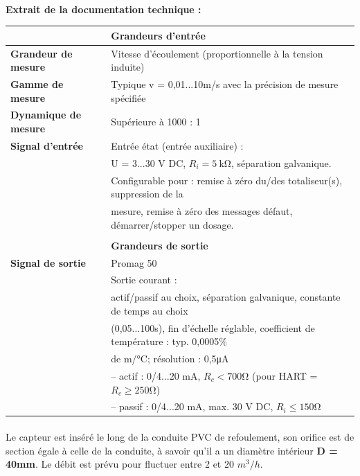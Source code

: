 \documentclass{article}
\begin{document}
\paragraph{}\textbf{Extrait de la documentation technique :}
\begin{table}[H]
    \centering
    \begin{tabular}{l l}
        & \textbf{Grandeurs d'entrée}\\
    \hline
    \textbf{Grandeur de mesure} & Vitesse d'écoulement (proportionnelle à la tension induite)\\
    \hline
    \textbf{Gamme de mesure}    & Typique v = 0,01...10m/s avec la précision de mesure spécifiée\\
    \hline
    \textbf{Dynamique de mesure}& Supérieure à 1000 : 1\\
    \hline
    \textbf{Signal d'entrée}    & Entrée état (entrée auxiliaire) :\\
    & U = 3...30 V DC, $R_i = \SI{5}{\kilo\ohm}$, séparation galvanique.\\
    & Configurable pour : remise à zéro du/des totaliseur(s), suppression de la\\
    & mesure,  remise à zéro des messages défaut, démarrer/stopper un dosage.\\
    \\
        & \textbf{Grandeurs de sortie}\\
    \hline
    \textbf{Signal de sortie} & Promag 50\\
    & Sortie courant :\\
    & actif/passif au choix, séparation galvanique, constante de temps au choix \\
    & (0,05...100s), fin d'échelle réglable, coefficient de température : typ. 0,0005\% \\
    & de m/\si{\celsius}; résolution : 0,5\si{\micro\ampere} \\
    & -- actif : 0/4...20 mA, $R_c < 700\si{\ohm}$ (pour HART = $R_c \ge 250\si{\ohm}$)\\
    & -- passif : 0/4...20 mA, max. 30 V DC, $R_i \le 150\si{\ohm}$\\
\end{tabular}
\end{table}

\paragraph{}
Le capteur est inséré le long de la conduite PVC de refoulement, son orifice est de section égale à celle de la conduite, à savoir qu'il a un diamètre intérieur \textbf{D = 40mm}. Le débit est prévu pour fluctuer entre 2 et 20 $m^3/h$.
\end{document}
